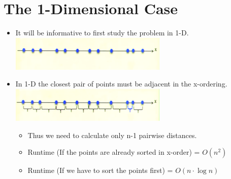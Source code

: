 \documentclass[12pt]{article}
\begin{document}
\section{The 1-Dimensional Case}
\renewcommand{\labelitemii}{$\circ$}
\renewcommand{\labelitemiii}{$\cdot$}
\renewcommand{\labelitemiii}{$\rightarrow$}
\renewcommand{\labelitemiv}{$\star$}
\begin{itemize}
\item It will be informative to first study the problem in 1-D.\\
\includegraphics{lecture61}
\item In 1-D the closest pair of points must be adjacent in the x-ordering.\\
\includegraphics{lecture62}
	\begin{itemize}
	\item Thus we need to calculate only n-1 pairwise distances.
	
	\item Runtime (If the points are already sorted in x-order) = $O(n^2)$
	\item Runtime (If we have to sort the points first) = $O(n \cdot \log{}n)$
	\end{itemize}
\end{itemize}
\end{document}
